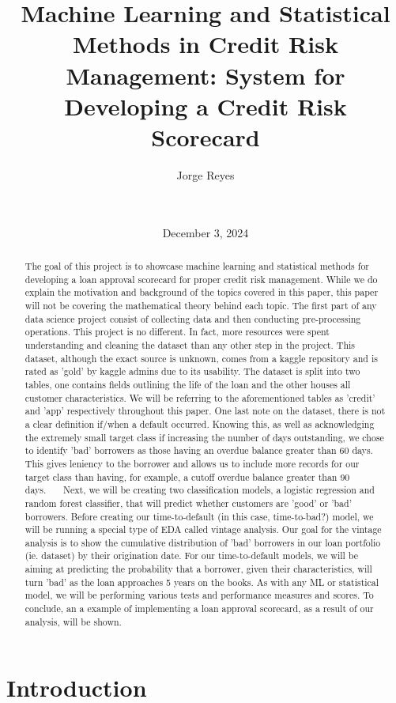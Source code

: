 \documentclass[12pt]{article}
\title{Machine Learning and Statistical Methods in Credit Risk Management: System for Developing a Credit Risk Scorecard \\[0.5cm]}
\author{Jorge Reyes \\[0.25cm] \text{University of Tennessee, Knoxville} \\[0.25cm] \text{COSC 522 Machine Learning} \\[0.25cm]}
\date{December 3, 2024}
\begin{document}
\maketitle
\clearpage %

\tableofcontents
\newpage

\section{Introduction}
\begin{abstract}
The goal of this project is to showcase machine learning and statistical methods for developing a loan approval scorecard for proper credit risk management.
While we do explain the motivation and background of the topics covered in this paper, this paper will not be covering the mathematical theory behind each topic.
The first part of any data science project consist of collecting data and then conducting pre-processing operations. This project is no different.
In fact, more resources were spent understanding and cleaning the dataset than any other step in the project.
This dataset, although the exact source is unknown, comes from a kaggle repository and is rated as 'gold' by kaggle admins due to its usability.
The dataset is split into two tables, one contains fields outlining the life of the loan and the other houses all customer characteristics.
We will be referring to the aforementioned tables as 'credit' and 'app' respectively throughout this paper.
One last note on the dataset, there is not a clear definition if/when a default occurred.
Knowing this, as well as acknowledging the extremely small target class if increasing the number of days outstanding,
we chose to identify 'bad' borrowers as those having an overdue balance greater than 60 days.
This gives leniency to the borrower and allows us to include more records for our target class than having, for example, a cutoff overdue balance greater than 90 days.   
Next, we will be creating two classification models, a logistic regression and random forest classifier, that will predict whether customers are 'good' or 'bad' borrowers.
Before creating our time-to-default (in this case, time-to-bad?) model, we will be running a special type of EDA called vintage analysis.
Our goal for the vintage analysis is to show the cumulative distribution of 'bad' borrowers in our loan portfolio (ie. dataset) by their origination date.
For our time-to-default models, we will be aiming at predicting the probability that a borrower, given their characteristics, will turn 'bad' as the loan approaches 5 years on the books.
As with any ML or statistical model, we will be performing various tests and performance measures and scores.
To conclude, an a example of implementing a loan approval scorecard, as a result of our analysis, will be shown.
\end{abstract}
\end{document}
